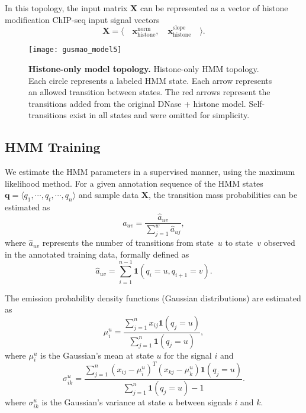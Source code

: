 In this topology, the input matrix $\mathbf{X}$ can be represented as a vector of histone modification ChIP-seq input signal vectors
\begin{equation}
  \label{eq:signal.m5}
  \mathbf{X} = \langle \quad \mathbf{x}^{\text{norm}}_{\text{histone}} ,\quad \mathbf{x}^{\text{slope}}_{\text{histone}} \quad \rangle .
\end{equation}

\begin{figure}[h!]
\centering
\texttt{[image: gusmao\_model5]}
\caption[Histone-only model topology]{\textbf{Histone-only model topology.} Histone-only HMM topology. Each circle represents a labeled HMM state. Each arrow represents an allowed transition between states. The red arrows represent the transitions added from the original DNase + histone model. Self-transitions exist in all states and were omitted for simplicity.}
\label{fig:gusmao_model5}
\end{figure}

\subsection{HMM Training}
\label{sec:hmm.training}

We estimate the HMM parameters in a supervised manner, using the maximum likelihood method. For a given annotation sequence of the HMM states $\mathbf{q} = \langle q_1, \cdots, q_t, \cdots, q_n \rangle$ and sample data $\mathbf{X}$, the transition mass probabilities can be estimated as
\begin{equation}
  \label{eq:hmm.train.a.1}
  a_{uv} = \frac{ \hat{a}_{uv}}{ \sum_{j=1}^{w} \hat{a}_{uj}},
\end{equation}
where $ \hat{a}_{uv} $ represents the number of transitions from state~$u$ to state~$v$ observed in the annotated training data, formally defined as
\begin{equation}
  \label{eq:hmm.train.a.2}
  \hat{a}_{uv} = \sum_{i=1}^{n-1} \mathbf{1} (q_i=u, q_{i+1}=v).
\end{equation}

The emission probability density functions (Gaussian distributions) are estimated as
\begin{equation}
  \label{eq:hmm.train.e.1}
  \mu^{u}_{i} = \frac{ \sum_{j=1}^{n} {x}_{ij} {\mathbf{1}}(q_j=u) }{ \sum_{j=1}^{n} {\mathbf{1}} (q_j=u) },
\end{equation}
where $ \mu^{u}_{i} $ is the Gaussian's mean at state $u$ for the signal $i$ and
\begin{equation}
  \label{eq:hmm.train.e.2}
  {\sigma}^{u}_{ik} = \frac{\sum_{j=1}^{n} ({x}_{ij} - \mu^{u}_{i})^T({x}_{kj} - \mu^{u}_{k}) {\mathbf{1}} (q_j=u)}
  {\sum_{j=1}^{n} {\mathbf{1}} (q_j=u) - 1}.
\end{equation}
where $ \sigma^{u}_{ik} $ is the Gaussian's variance at state $u$ between signals $i$ and $k$.

